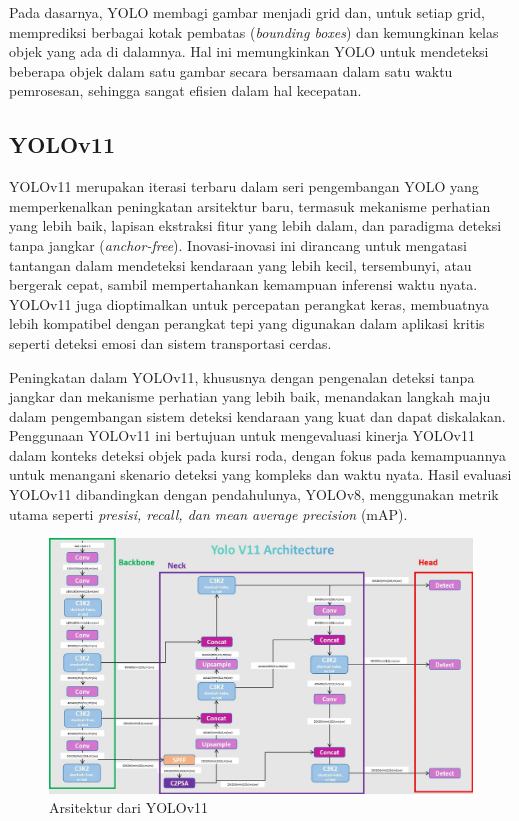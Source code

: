 Pada dasarnya, YOLO membagi gambar menjadi grid dan, untuk setiap grid, memprediksi berbagai kotak pembatas (\emph{bounding boxes}) dan kemungkinan kelas objek yang ada di dalamnya. Hal ini memungkinkan YOLO untuk mendeteksi beberapa objek dalam satu gambar secara bersamaan dalam satu waktu pemrosesan, sehingga sangat efisien dalam hal kecepatan.

\subsection{YOLOv11}
YOLOv11 merupakan iterasi terbaru dalam seri pengembangan YOLO yang memperkenalkan peningkatan arsitektur baru, termasuk mekanisme perhatian yang lebih baik, lapisan ekstraksi fitur yang lebih dalam, dan paradigma deteksi tanpa jangkar (\emph{anchor-free}). Inovasi-inovasi ini dirancang untuk mengatasi tantangan dalam mendeteksi kendaraan yang lebih kecil, tersembunyi, atau bergerak cepat, sambil mempertahankan kemampuan inferensi waktu nyata. YOLOv11 juga dioptimalkan untuk percepatan perangkat keras, membuatnya lebih kompatibel dengan perangkat tepi yang digunakan dalam aplikasi kritis seperti deteksi emosi dan sistem transportasi cerdas\cite{luhao24}.

Peningkatan dalam YOLOv11, khususnya dengan pengenalan deteksi tanpa jangkar dan mekanisme perhatian yang lebih baik, menandakan langkah maju dalam pengembangan sistem deteksi kendaraan yang kuat dan dapat diskalakan. Penggunaan YOLOv11 ini bertujuan untuk mengevaluasi kinerja YOLOv11 dalam konteks deteksi objek pada kursi roda, dengan fokus pada kemampuannya untuk menangani skenario deteksi yang kompleks dan waktu nyata. Hasil evaluasi YOLOv11 dibandingkan dengan pendahulunya, YOLOv8, menggunakan metrik utama seperti\emph{ presisi, recall, dan mean average precision} (mAP).
\begin{figure} [H] \centering
  \includegraphics[scale=0.28]{gambar/Arsitektur YOLOv11.jpg}
  \caption{Arsitektur dari YOLOv11 }
  \label{fig:YOLOv11}
\end{figure}

